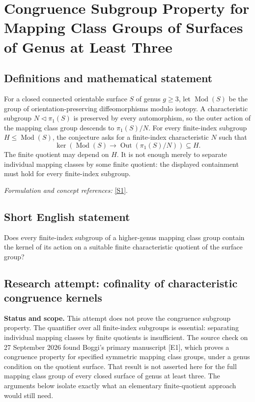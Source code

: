 \documentclass[11pt]{article}
\begin{document}
\section*{\texorpdfstring{Congruence Subgroup Property for Mapping Class Groups of Surfaces of Genus at Least Three}{Congruence Subgroup Property for Mapping Class Groups of Surfaces of Genus at Least Three}}\label{30006986}
\subsection{Definitions and mathematical statement}
For a closed connected orientable surface $S$ of genus $g\ge3$, let $\operatorname{Mod}(S)$ be the group of orientation-preserving diffeomorphisms modulo isotopy. A characteristic subgroup $N\triangleleft\pi_1(S)$ is preserved by every automorphism, so the outer action of the mapping class group descends to $\pi_1(S)/N$. For every finite-index subgroup $H\le\operatorname{Mod}(S)$, the conjecture asks for a finite-index characteristic $N$ such that
\[
 \ker\!\left(\operatorname{Mod}(S)\longrightarrow
 \operatorname{Out}(\pi_1(S)/N)\right)\subseteq H.
\]
The finite quotient may depend on $H$. It is not enough merely to separate individual mapping classes by some finite quotient: the displayed containment must hold for every finite-index subgroup.
\par\smallskip\textit{Formulation and concept references:} \href{https://arxiv.org/pdf/math/0608325}{[S1]}.

\subsection{Short English statement}
Does every finite-index subgroup of a higher-genus mapping class group contain the kernel of its action on a suitable finite characteristic quotient of the surface group?
\subsection{Research attempt: cofinality of characteristic congruence kernels}
\textbf{Status and scope.} This attempt does not prove the congruence subgroup property. The quantifier over all finite-index subgroups is essential: separating individual mapping classes by finite quotients is insufficient. The source check on 27 September 2026 found Boggi's primary manuscript [E1], which proves a congruence property for specified symmetric mapping class groups, under a genus condition on the quotient surface. That result is not asserted here for the full mapping class group of every closed surface of genus at least three. The arguments below isolate exactly what an elementary finite-quotient approach would still need.
\end{document}
